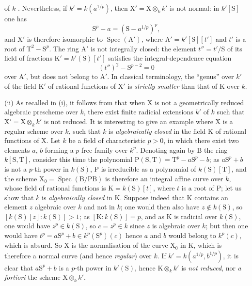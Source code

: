\begin{remarks}[6.7.5]

of $k$ . Nevertheless, if $k'=k(a^{1/p})$, then $\mathrm{X}'=\mathrm{X}\otimes_k k'$ is not normal: in $k'[\mathrm{S}]$ one has
\[
 \mathrm{S}^p-a=(\mathrm{S}-a^{1/p})^p,
\]
and $\mathrm{X}'$ is therefore isomorphic to $\operatorname{Spec}(\mathrm{A}')$, where $\mathrm{A}'=k'[\mathrm{S}][t']$ and $t'$ is a root of $\mathrm{T}^2-\mathrm{S}^p$. The ring $\mathrm{A}'$ is not integrally closed: the element $t''=t'/\mathrm{S}$ of its field of fractions $\mathrm{K}'=k'(\mathrm{S})[t']$ satisfies the integral-dependence equation
\[
 (t'')^2-\mathrm{S}^{p-2}=0
\]
over $\mathrm{A}'$, but does not belong to $\mathrm{A}'$. In classical terminology, the ``genus'' over $k'$ of the field $\mathrm{K}'$ of rational functions of $\mathrm{X}'$ is \emph{strictly smaller} than that of $\mathrm{K}$ over $k$.

(ii) As recalled in (i), it follows from  that when $\mathrm{X}$ is not a geometrically reduced algebraic prescheme over $k$, there exist finite radicial extensions $k'$ of $k$ such that $\mathrm{X}'=\mathrm{X}\otimes_k k'$ is not reduced. It is interesting to give an example where $\mathrm{X}$ is a regular scheme over $k$, such that $k$ is \emph{algebraically closed} in the field $\mathrm{K}$ of rational functions of $\mathrm{X}$. Let $k$ be a field of characteristic $p>0$, in which there exist two elements $a$, $b$ forming a $p$-free family over $k^p$. Denoting again by $\mathrm{B}$ the ring $k[\mathrm{S},\mathrm{T}]$, consider this time the polynomial $\mathrm{P}(\mathrm{S},\mathrm{T})=\mathrm{T}^p-a\mathrm{S}^p-b$; as $a\mathrm{S}^p+b$ is not a $p$-th power in $k(\mathrm{S})$, $\mathrm{P}$ is irreducible as a polynomial of $k(\mathrm{S})[\mathrm{T}]$, and the scheme $\mathrm{X}_0=\operatorname{Spec}(\mathrm{B}/\mathrm{PB})$ is therefore an integral affine curve over $k$, whose field of rational functions is $\mathrm{K}=k(\mathrm{S})[t]$, where $t$ is a root of $\mathrm{P}$; let us show that $k$ is \emph{algebraically closed} in $\mathrm{K}$. Suppose indeed that $\mathrm{K}$ contains an element $z$ algebraic over $k$ and not in $k$; one would then also have $z\notin k(\mathrm{S})$, so $[k(\mathrm{S})[z]:k(\mathrm{S})]>1$; as $[\mathrm{K}:k(\mathrm{S})]=p$, and as $\mathrm{K}$ is radicial over $k(\mathrm{S})$, one would have $z^p\in k(\mathrm{S})$, so $c=z^p\in k$ since $z$ is algebraic over $k$; but then one would have $t^p=a\mathrm{S}^p+b\in k^p(\mathrm{S}^p)(c)$ hence $a$ and $b$ would belong to $k^p(c)$, which is absurd. So $\mathrm{X}$ is the normalisation of the curve $\mathrm{X}_0$ in $\mathrm{K}$, which is therefore a normal curve (and hence \emph{regular}) over $k$. If $k'=k(a^{1/p},b^{1/p})$, it is clear that $a\mathrm{S}^p+b$ is a $p$-th power in $k'(\mathrm{S})$, hence $\mathrm{K}\otimes_k k'$ is \emph{not reduced}, nor \emph{a fortiori} the scheme $\mathrm{X}\otimes_k k'$.
\end{remarks}

